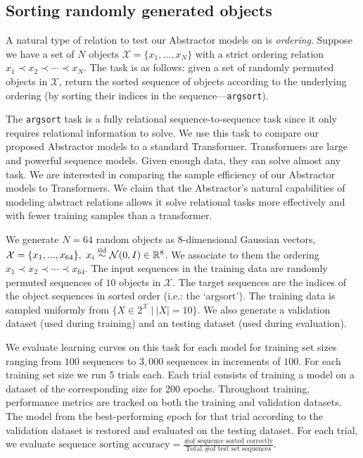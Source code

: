 \subsection{Sorting randomly generated objects}
\label{ssec:random_object_argsort}
\def\subtask#1{\noindent{\it\bfseries #1.}}


A natural type of relation to test our Abstractor models on is \textit{ordering}. Suppose we have a set of $N$ objects $\mathcal{X} = \{ x_1 , ..., x_N \}$ with a strict ordering relation $x_1 \prec x_2 \prec \cdots \prec x_N$. The task is as follows: given a set of randomly permuted objects in $\mathcal{X}$, return the sorted sequence of objects according to the underlying ordering (by sorting their indices in the sequence---\texttt{argsort}).

The \texttt{argsort} task is a fully relational sequence-to-sequence task since it only requires relational information to solve. We use this task to compare our proposed Abstractor models to a standard Transformer. Transformers are large and powerful sequence models. Given enough data, they can solve almost any task. We are interested in comparing the sample efficiency of our Abstractor models to Transformers. We claim that the Abstractor's natural capabilities of modeling abstract relations allows it solve relational tasks more effectively and with fewer training samples than a transformer.

\subtask{Random object sorting task} We generate $N=64$ random objects as 8-dimensional Gaussian vectors, $\mathcal{X} = \{ x_1 , ..., x_{64} \}, \ x_i \overset{\mathrm{iid}}{\sim} \mathcal{N}(0, I) \in \mathbb{R}^8$. We associate to them the ordering $x_1 \prec x_2 \prec \cdots \prec x_{64}$. The input sequences in the training data are randomly permuted sequences of $10$ objects in $\mathcal{X}$. The target sequences are the indices of the object sequences in sorted order (i.e.: the `argsort'). The training data is sampled uniformly from $\{ X \in 2^\mathcal{X} \ \vert \ |X| = 10\}$. We also generate a validation dataset (used during training) and an testing dataset (used during evaluation).

\subtask{Evaluation} We evaluate learning curves on this task for each model for training set sizes ranging from $100$ sequences to $3,000$ sequences in increments of $100$. For each training set size we run 5 trials each. Each trial consists of training a model on a dataset of the corresponding size for 200 epochs. Throughout training, performance metrics are tracked on both the training and validation datasets. The model from the best-performing epoch for that trial according to the validation dataset is restored and evaluated on the testing dataset. For each trial, we evaluate $\text{sequence sorting accuracy} = \frac{\text{\# of sequence sorted correctly}}{\text{Total \# of test set sequences}}$.

